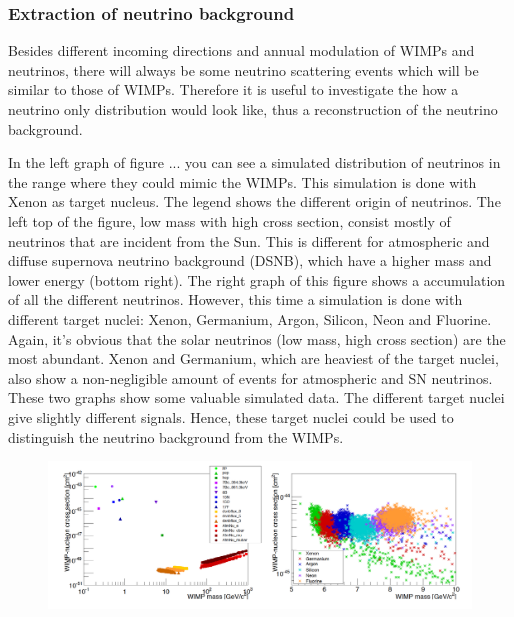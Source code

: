 \documentclass{article}
\begin{document}
\FloatBarrier
\subsubsection{Extraction of neutrino background}
Besides different incoming directions and annual modulation of WIMPs and neutrinos, there will always be some neutrino scattering events which will be similar to those of WIMPs. Therefore it is useful to investigate the how a neutrino only distribution would look like, thus a reconstruction of the neutrino background. 

In the left graph of figure ... you can see a simulated distribution of neutrinos in the range where they could mimic the WIMPs. This simulation is done with Xenon as target nucleus. The legend shows the different origin of neutrinos. The left top of the figure, low mass with high cross section, consist mostly of neutrinos that are incident from the Sun. This is different for atmospheric and diffuse supernova neutrino background (DSNB), which have a higher mass and lower energy (bottom right).
The right graph of this figure shows a accumulation of all the different neutrinos. However, this time a simulation is done with different target nuclei: Xenon, Germanium, Argon, Silicon, Neon and Fluorine. Again, it's obvious that the solar neutrinos (low mass, high cross section) are the most abundant. Xenon and Germanium, which are heaviest of the target nuclei, also show a non-negligible amount of events for atmospheric and SN neutrinos. 
These two graphs show some valuable simulated data. The different target nuclei give slightly different signals. Hence, these target nuclei could be used to distinguish the neutrino background from the WIMPs.
\begin{figure}[h]
    \centering
    \includegraphics[width=\textwidth]{Neutrinos3.png}
    \caption{\cite{Billard:2013qya}}
\end{figure}







\FloatBarrier

\
\newpage


\end{document}
